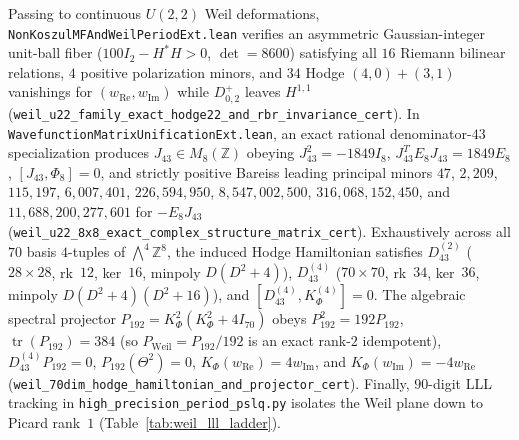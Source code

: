\documentclass[11pt,a4paper]{article}
\begin{document}
Passing to continuous $U(2,2)$ Weil deformations, {\small\texttt{Non\allowbreak{}Koszul\allowbreak{}MF\allowbreak{}And\allowbreak{}Weil\allowbreak{}Period\allowbreak{}Ext.lean}} verifies an asymmetric Gaussian-integer unit-ball fiber ($100 I_2 - H^* H > 0$, $\det = 8600$) satisfying all $16$ Riemann bilinear relations, $4$ positive polarization minors, and $34$ Hodge $(4,0)+(3,1)$ vanishings for $(w_{\mathrm{Re}}, w_{\mathrm{Im}})$ while $D^+_{0,2}$ leaves $H^{1,1}$ ({\small\texttt{weil\_\allowbreak{}u22\_\allowbreak{}family\_\allowbreak{}exact\_\allowbreak{}hodge22\_\allowbreak{}and\_\allowbreak{}rbr\_\allowbreak{}invariance\_\allowbreak{}cert}}). In {\small\texttt{Wavefunction\allowbreak{}Matrix\allowbreak{}Unification\allowbreak{}Ext.lean}}, an exact rational denominator-$43$ specialization produces $J_{43} \in M_8(\mathbb{Z})$ obeying $J_{43}^2 = -1849 I_8$, $J_{43}^T E_8 J_{43} = 1849 E_8$, $[J_{43}, \Phi_8] = 0$, and strictly positive Bareiss leading principal minors $47$, $2{,}209$, $115{,}197$, $6{,}007{,}401$, $226{,}594{,}950$, $8{,}547{,}002{,}500$, $316{,}068{,}152{,}450$, and $11{,}688{,}200{,}277{,}601$ for $-E_8 J_{43}$ ({\small\texttt{weil\_\allowbreak{}u22\_\allowbreak{}8x8\_\allowbreak{}exact\_\allowbreak{}complex\_\allowbreak{}structure\_\allowbreak{}matrix\_\allowbreak{}cert}}). Exhaustively across all $70$ basis $4$-tuples of $\bigwedge^4 \mathbb{Z}^8$, the induced Hodge Hamiltonian satisfies $D_{43}^{(2)}$ ($28\times 28$, rk~$12$, ker~$16$, minpoly $D(D^2+4)$), $D_{43}^{(4)}$ ($70\times 70$, rk~$34$, ker~$36$, minpoly $D(D^2+4)(D^2+16)$), and $[D_{43}^{(4)}, K_\Phi^{(4)}] = 0$. The algebraic spectral projector $P_{192} = K_\Phi^2(K_\Phi^2 + 4I_{70})$ obeys $P_{192}^2 = 192 P_{192}$, $\operatorname{tr}(P_{192}) = 384$ (so $P_{\mathrm{Weil}} = P_{192}/192$ is an exact rank-$2$ idempotent), $D_{43}^{(4)} P_{192} = 0$, $P_{192}(\Theta^2) = 0$, $K_\Phi(w_{\mathrm{Re}}) = 4 w_{\mathrm{Im}}$, and $K_\Phi(w_{\mathrm{Im}}) = -4 w_{\mathrm{Re}}$ ({\small\texttt{weil\_\allowbreak{}70dim\_\allowbreak{}hodge\_\allowbreak{}hamiltonian\_\allowbreak{}and\_\allowbreak{}projector\_\allowbreak{}cert}}). Finally, $90$-digit LLL tracking in {\small\texttt{high\_\allowbreak{}precision\_\allowbreak{}period\_\allowbreak{}pslq.py}} isolates the Weil plane down to Picard rank~$1$ (Table~\ref{tab:weil_lll_ladder}).
\end{document}
